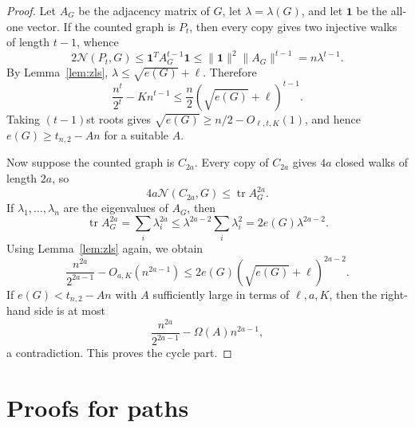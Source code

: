 \documentclass[11pt]{article}
\theoremstyle{definition}
\theoremstyle{plain}
\theoremstyle{remark}
\theoremstyle{plain}
\numberwithin{equation}{section}
\newcommand{\N}{\mathcal N}
\begin{document}
\begin{proof}
Let $A_G$ be the adjacency matrix of $G$, let $\lambda=\lambda(G)$, and let $\mathbf1$ be the all-one vector. If the counted graph is $P_t$, then every copy gives two injective walks of length $t-1$, whence
\[
        2\N(P_t,G)\le \mathbf1^TA_G^{t-1}\mathbf1
        \le \|\mathbf1\|^2\|A_G\|^{t-1}=n\lambda^{t-1}.
\]
By Lemma~\ref{lem:zls}, $\lambda\le\sqrt{e(G)}+\ell$. Therefore
\[
        \frac{n^t}{2^t}-Kn^{t-1}
        \le \frac n2(\sqrt{e(G)}+\ell)^{t-1}.
\]
Taking $(t-1)$st roots gives $\sqrt{e(G)}\ge n/2-O_{\ell,t,K}(1)$, and hence $e(G)\ge t_{n,2}-A n$ for a suitable $A$.

Now suppose the counted graph is $C_{2a}$. Every copy of $C_{2a}$ gives $4a$ closed walks of length $2a$, so
\[
        4a\N(C_{2a},G)\le \operatorname{tr} A_G^{2a}.
\]
If $\lambda_1,\ldots,\lambda_n$ are the eigenvalues of $A_G$, then
\[
        \operatorname{tr} A_G^{2a}=\sum_i\lambda_i^{2a}
        \le \lambda^{2a-2}\sum_i\lambda_i^2=2e(G)\lambda^{2a-2}.
\]
Using Lemma~\ref{lem:zls} again, we obtain
\[
        \frac{n^{2a}}{2^{2a-1}}-O_{a,K}(n^{2a-1})
        \le 2e(G)(\sqrt{e(G)}+\ell)^{2a-2}.
\]
If $e(G)<t_{n,2}-An$ with $A$ sufficiently large in terms of $\ell,a,K$, then the right-hand side is at most
\[
        \frac{n^{2a}}{2^{2a-1}}-\Omega(A)n^{2a-1},
\]
a contradiction. This proves the cycle part.
\end{proof}

\section{Proofs for paths}\label{sec:proofs-paths}
\end{document}
